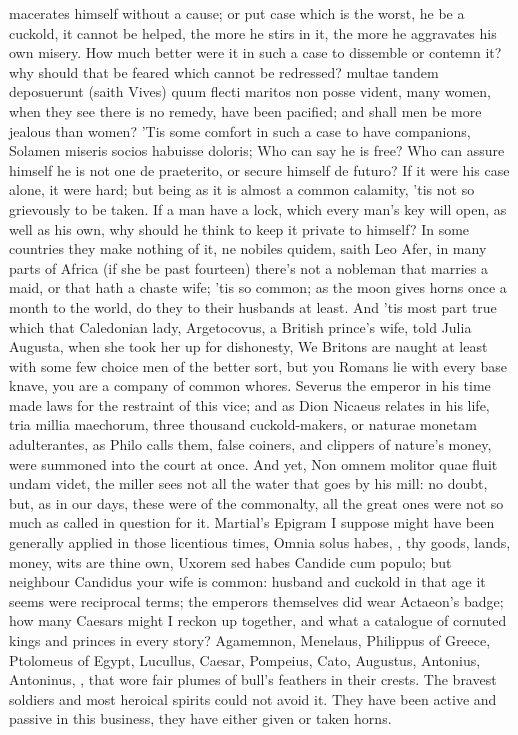 macerates himself without a cause; or put case which is the worst, he
be a cuckold, it cannot be helped, the more he stirs in it, the more he
aggravates his own misery. How much better were it in such a case to
dissemble or contemn it? why should that be feared which cannot be
redressed? multae tandem deposuerunt (saith Vives) quum flecti
maritos non posse vident, many women, when they see there is no remedy,
have been pacified; and shall men be more jealous than women? 'Tis some
comfort in such a case to have companions, Solamen miseris socios
habuisse doloris; Who can say he is free? Who can assure himself he is
not one de praeterito, or secure himself de futuro? If it were his case
alone, it were hard; but being as it is almost a common calamity, 'tis
not so grievously to be taken. If a man have a lock, which every man's
key will open, as well as his own, why should he think to keep it
private to himself? In some countries they make nothing of it, ne
nobiles quidem, saith Leo Afer, in many parts of Africa (if she
be past fourteen) there's not a nobleman that marries a maid, or that
hath a chaste wife; 'tis so common; as the moon gives horns once a
month to the world, do they to their husbands at least. And 'tis most
part true which that Caledonian lady, Argetocovus, a British
prince's wife, told Julia Augusta, when she took her up for dishonesty,
We Britons are naught at least with some few choice men of the better
sort, but you Romans lie with every base knave, you are a company of
common whores. Severus the emperor in his time made laws for the
restraint of this vice; and as Dion Nicaeus relates in his life,
tria millia maechorum, three thousand cuckold-makers, or naturae
monetam adulterantes, as Philo calls them, false coiners, and clippers
of nature's money, were summoned into the court at once. And yet, Non
omnem molitor quae fluit undam videt, the miller sees not all the water
that goes by his mill: no doubt, but, as in our days, these were of the
commonalty, all the great ones were not so much as called in question
for it. Martial's Epigram I suppose might have been generally
applied in those licentious times, Omnia solus habes, \etc{}, thy goods,
lands, money, wits are thine own, Uxorem sed habes Candide cum populo;
but neighbour Candidus your wife is common: husband and cuckold in that
age it seems were reciprocal terms; the emperors themselves did wear
Actaeon's badge; how many Caesars might I reckon up together, and what
a catalogue of cornuted kings and princes in every story? Agamemnon,
Menelaus, Philippus of Greece, Ptolomeus of Egypt, Lucullus, Caesar,
Pompeius, Cato, Augustus, Antonius, Antoninus, \etc{}, that wore fair
plumes of bull's feathers in their crests. The bravest soldiers and
most heroical spirits could not avoid it. They have been active and
passive in this business, they have either given or taken horns.

